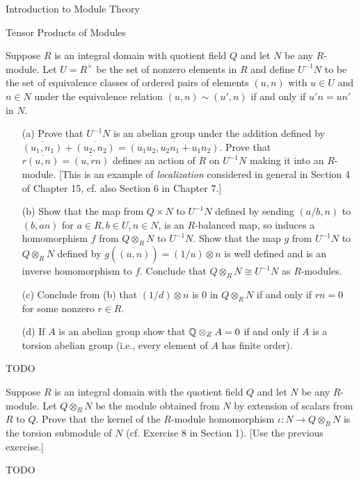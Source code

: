 \begin{chapter}{Introduction to Module Theory}
\begin{section}{Tensor Products of Modules}
\begin{problem}\label{ex:10.4.8}
Suppose $R$ is an integral domain with quotient field $Q$ and let $N$ be any $R$-module. Let $U = R^\times$ be the set of nonzero elements in $R$ and define $U^{-1}N$ to be the set of equivalence classes of ordered pairs of elements $(u,n)$ with $u\in U$ and $n\in N$ under the equivalence relation $(u,n)\sim (u',n)$ if and only if $u'n = un'$ in $N$. 
\begin{enumerate}
\item[(a)] Prove that $U^{-1}N$ is an abelian group under the addition defined by $\overline{(u_1,n_1)} + \overline{(u_2,n_2)} = \overline{(u_1u_2,u_2n_1+u_1n_2)}$. Prove that $r\overline{(u,n)} = \overline{(u,rn)}$ defines an action of $R$ on $U^{-1}N$ making it into an $R$-module. [This is an example of \emph{localization} considered in general in Section 4 of Chapter 15, cf. also Section 6 in Chapter 7.]
\item[(b)]  Show that the map from $Q\times N$ to $U^{-1}N$ defined by sending $(a/b,n)$ to $\overline{(b,an)}$ for $a\in R, b\in U,n\in N$, is an $R$-balanced map, so induces a homomorphism $f$ from $Q\otimes_RN$ to $U^{-1}N$. Show that the map $g$ from $U^{-1}N$ to $Q\otimes_RN$ defined by $g(\overline{(u,n)}) = (1/u)\otimes n$ is well defined and is an inverse homomorphism to $f$. Conclude that $Q\otimes _R N \cong U^{-1}N$ as $R$-modules. 
\item[(c)] Conclude from (b) that $(1/d)\otimes n$ is 0 in $Q\otimes_R N$ if and only if $rn=0$ for some nonzero $r\in R$. 
\item[(d)] If $A$ is an abelian group show that $\mathbb{Q}\otimes_Z A = 0$ if and only if $A$ is a torsion abelian group (i.e., every element of $A$ has finite order). 
\end{enumerate}
\end{problem}
\begin{solution}TODO

\end{solution}\oneperpage



\begin{problem}\label{ex:10.4.9}
Suppose $R$ is an integral domain with the quotient field $Q$ and let $N$ be any $R$-module. Let $Q\otimes_RN$ be the module obtained from $N$ by extension of scalars from $R$ to $Q$. Prove that the kernel of the $R$-module homomorphism $\iota:N\to Q\otimes_RN$ is the torsion submodule of $N$ (cf. Exercise 8 in Section 1).  [Use the previous exercise.] 
\end{problem}
\begin{solution}TODO


\end{solution}
\end{section}
\end{chapter}
